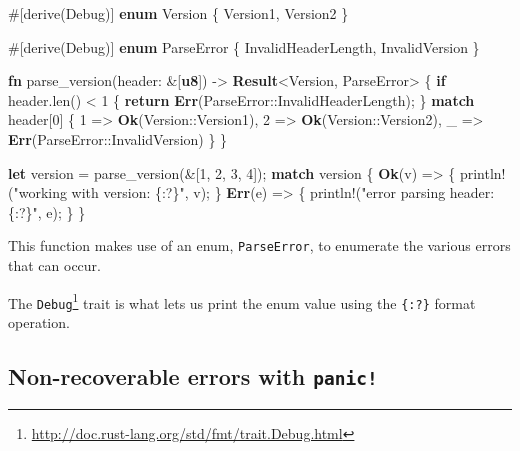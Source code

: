 \documentclass[a4paper,]{book}
\newenvironment{Shaded}{\begin{snugshade}}{\end{snugshade}}
\newcommand{\KeywordTok}[1]{\textcolor[rgb]{0.13,0.29,0.53}{\textbf{{#1}}}}
\newcommand{\DecValTok}[1]{\textcolor[rgb]{0.00,0.00,0.81}{{#1}}}
\newcommand{\StringTok}[1]{\textcolor[rgb]{0.31,0.60,0.02}{{#1}}}
\newcommand{\OtherTok}[1]{\textcolor[rgb]{0.56,0.35,0.01}{{#1}}}
\newcommand{\NormalTok}[1]{{#1}}
\renewcommand{\href}[2]{#2\footnote{\url{#1}}}
\begin{document}
\begin{Shaded}
\begin{Highlighting}[]
\OtherTok{#[}\NormalTok{derive}\OtherTok{(}\NormalTok{Debug}\OtherTok{)]}
\KeywordTok{enum} \NormalTok{Version \{ Version1, Version2 \}}

\OtherTok{#[}\NormalTok{derive}\OtherTok{(}\NormalTok{Debug}\OtherTok{)]}
\KeywordTok{enum} \NormalTok{ParseError \{ InvalidHeaderLength, InvalidVersion \}}

\KeywordTok{fn} \NormalTok{parse_version(header: &[}\KeywordTok{u8}\NormalTok{]) -> }\KeywordTok{Result}\NormalTok{<Version, ParseError> \{}
    \KeywordTok{if} \NormalTok{header.len() < }\DecValTok{1} \NormalTok{\{}
        \KeywordTok{return} \KeywordTok{Err}\NormalTok{(ParseError::InvalidHeaderLength);}
    \NormalTok{\}}
    \KeywordTok{match} \NormalTok{header[}\DecValTok{0}\NormalTok{] \{}
        \DecValTok{1} \NormalTok{=> }\KeywordTok{Ok}\NormalTok{(Version::Version1),}
        \DecValTok{2} \NormalTok{=> }\KeywordTok{Ok}\NormalTok{(Version::Version2),}
        \NormalTok{_ => }\KeywordTok{Err}\NormalTok{(ParseError::InvalidVersion)}
    \NormalTok{\}}
\NormalTok{\}}

\KeywordTok{let} \NormalTok{version = parse_version(&[}\DecValTok{1}\NormalTok{, }\DecValTok{2}\NormalTok{, }\DecValTok{3}\NormalTok{, }\DecValTok{4}\NormalTok{]);}
\KeywordTok{match} \NormalTok{version \{}
    \KeywordTok{Ok}\NormalTok{(v) => \{}
        \OtherTok{println!}\NormalTok{(}\StringTok{"working with version: \{:?\}"}\NormalTok{, v);}
    \NormalTok{\}}
    \KeywordTok{Err}\NormalTok{(e) => \{}
        \OtherTok{println!}\NormalTok{(}\StringTok{"error parsing header: \{:?\}"}\NormalTok{, e);}
    \NormalTok{\}}
\NormalTok{\}}
\end{Highlighting}
\end{Shaded}

This function makes use of an enum, \texttt{ParseError}, to enumerate
the various errors that can occur.

The
\href{http://doc.rust-lang.org/std/fmt/trait.Debug.html}{\texttt{Debug}}
trait is what lets us print the enum value using the \texttt{\{:?\}}
format operation.

\subsection{\texorpdfstring{Non-recoverable errors with
\texttt{panic!}}{Non-recoverable errors with panic!}}\label{non-recoverable-errors-with-panic}
\end{document}

